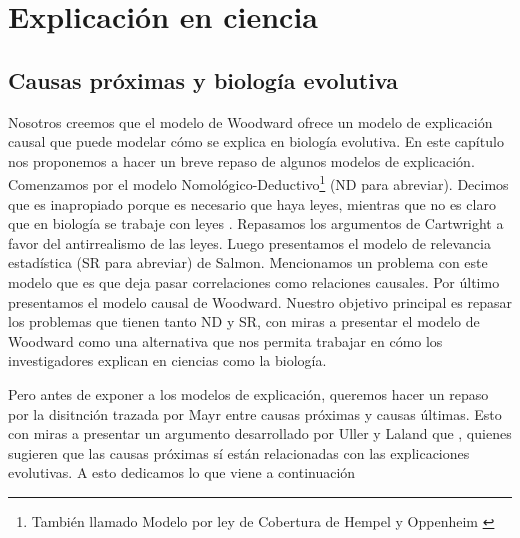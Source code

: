 
\chapter{Explicación en ciencia}

\section{Causas próximas y biología evolutiva}

\noindent Nosotros creemos que el modelo de Woodward ofrece un modelo de explicación causal que puede modelar cómo se explica en biología evolutiva. En este capítulo nos proponemos a hacer un breve repaso de algunos modelos de explicación. Comenzamos por el modelo Nomológico-Deductivo\footnote{También llamado Modelo por ley de Cobertura de Hempel y Oppenheim \citeyear{Hempel1948}} (ND para abreviar). Decimos que es inapropiado porque es necesario que haya leyes, mientras que no es claro que en biología se trabaje con leyes \cite{Brandon1997}. Repasamos los argumentos de Cartwright a favor del antirrealismo de las leyes. Luego presentamos el modelo de relevancia estadística (SR para abreviar) de Salmon. Mencionamos un problema con este modelo que es que deja pasar correlaciones como relaciones causales. Por último presentamos el modelo causal de Woodward. Nuestro objetivo principal es repasar los problemas que tienen tanto ND y SR, con miras a presentar el modelo de Woodward como una alternativa que nos permita trabajar en cómo los investigadores explican en ciencias como la biología.

Pero antes de exponer a los modelos de explicación, queremos hacer un repaso por la disitnción trazada por Mayr entre causas próximas y causas últimas. Esto con miras a presentar un argumento desarrollado por Uller y Laland que \cite{Laland2011, Uller2019}, quienes sugieren que las causas próximas sí están relacionadas con las explicaciones evolutivas. A esto dedicamos lo que viene a continuación


